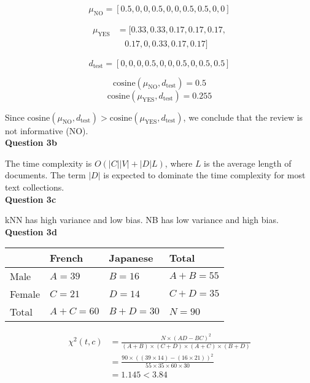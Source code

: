 \documentclass[11pt,a4paper]{report}
\begin{document}
\begin{multicols*}{2}
$$\mu_{\text{NO}} = [0.5, 0, 0, 0.5, 0, 0, 0.5, 0.5, 0, 0]$$

\begin{equation*}
\begin{split}
\mu_{\text{YES}} &= [0.33, 0.33, 0.17, 0.17, 0.17, \\
&\ \ \ \ 0.17, 0, 0.33, 0.17, 0.17]
\end{split}
\end{equation*}

$$d_{\text{test}} = [0,0,0,0.5,0,0,0.5,0,0.5,0.5]$$

$$\text{cosine}(\mu_{\text{NO}}, d_{\text{test}}) = 0.5$$
$$\text{cosine}(\mu_{\text{YES}}, d_{\text{test}}) = 0.255$$

\noindent Since $\text{cosine}(\mu_{\text{NO}}, d_{\text{test}}) > \text{cosine}(\mu_{\text{YES}}, d_{\text{test}})$, we conclude that the review is not informative (NO). \\

\noindent \textbf{Question 3b}

\noindent The time complexity is $O(|C||V|+|D|L)$, where $L$ is the average length of documents. The term $|D|$ is expected to dominate the time complexity for most text collections. \\

\noindent \textbf{Question 3c}

\noindent kNN has high variance and low bias. NB has low variance and high bias.\\

\noindent \textbf{Question 3d}

\scriptsize
\begin{center}
\begin{tabular}{ |l|l|l|l| }
    \hline
            & French     & Japanese   & Total \\
    \hline
    Male    & $A = 39$   & $B = 16$   & $A+B=55$ \\
    Female  & $C = 21$   & $D = 14$   & $C+D=35$ \\
    Total   & $A+C = 60$ & $B+D = 30$ & $N=90$ \\
    \hline
\end{tabular}
\end{center}
\normalsize

\begin{equation*}
\begin{split}
   \chi^2(t,c) &= \frac{N\times (AD - BC)^2}{(A+B) \times (C+D) \times (A+C) \times (B+D)} \\
   &= \frac{90\times ((39 \times 14) - (16 \times 21))^2}{55\times 35 \times 60 \times 30}\\
   &= 1.145 < 3.84
\end{split}
\end{equation*}


\end{multicols*}
\end{document}
